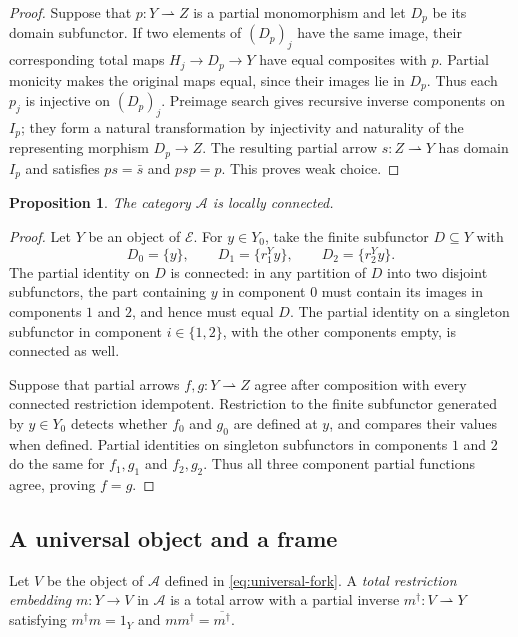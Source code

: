 \documentclass[11pt]{article}
\newtheorem{proposition}[theorem]{Proposition}
\begin{document}
\begin{proof}
Suppose that $p:Y\rightharpoonup Z$ is a partial monomorphism
and let $D_p$ be its domain subfunctor. If two elements of $(D_p)_j$
have the same image, their corresponding total maps
$H_j\to D_p\to Y$ have equal composites with $p$.
Partial monicity makes the original maps equal, since their
images lie in $D_p$. Thus each $p_j$ is injective on $(D_p)_j$.
Preimage search gives recursive inverse components on $I_p$;
they form a natural transformation by injectivity and naturality of
the representing morphism $D_p\to Z$.
The resulting partial arrow $s:Z\rightharpoonup Y$ has domain
$I_p$ and satisfies $ps=\bar s$ and $psp=p$.
This proves weak choice.
\end{proof}

\begin{proposition}\label{prop:fork-local}
The category $\mathcal A$ is locally connected.
\end{proposition}
\begin{proof}
Let $Y$ be an object of $\mathcal E$. For $y\in Y_0$, take the
finite subfunctor $D\subseteq Y$ with
\[
 D_0=\{y\},\qquad D_1=\{r_1^Yy\},\qquad D_2=\{r_2^Yy\}.
\]
The partial identity on $D$ is connected: in any partition of $D$
into two disjoint subfunctors, the part containing $y$ in component
$0$ must contain its images in components $1$ and $2$, and hence
must equal $D$. The partial identity on a singleton subfunctor
in component $i\in\{1,2\}$, with the other components empty,
is connected as well.

Suppose that partial arrows $f,g:Y\rightharpoonup Z$ agree
after composition with every connected restriction idempotent.
Restriction to the
finite subfunctor generated by $y\in Y_0$ detects whether
$f_0$ and $g_0$ are defined at $y$, and compares their values
when defined. Partial identities on singleton subfunctors in
components $1$ and $2$ do the same for $f_1,g_1$ and $f_2,g_2$.
Thus all three component partial functions agree, proving $f=g$.
\end{proof}

\subsection{A universal object and a frame}

Let $V$ be the object of $\mathcal A$ defined in
\eqref{eq:universal-fork}.
A \emph{total restriction embedding} $m:Y\to V$ in $\mathcal A$
is a total arrow with a partial inverse
$m^\dagger:V\rightharpoonup Y$ satisfying
$m^\dagger m=1_Y$ and $mm^\dagger=\overline{m^\dagger}$.
\end{document}
